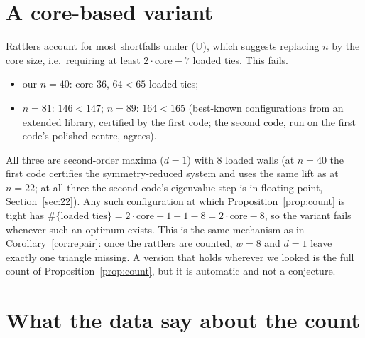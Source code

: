 \documentclass[11pt]{amsart}
\theoremstyle{definition}
\newcommand{\core}{\mathrm{core}}
\begin{document}
\section{A core-based variant}\label{sec:repair}

Rattlers account for most shortfalls under (U), which suggests replacing $n$ by the core size, i.e.\ requiring at least $2\cdot\core - 7$ loaded ties. This fails. %
\begin{itemize}
\item our $n = 40$: core $36$, $64 < 65$ loaded ties; %
\item $n = 81$: $146 < 147$; $n = 89$: $164 < 165$ (best-known configurations from an extended library, certified by the first code; the second code, run on the first code's polished centre, agrees). %
\end{itemize}
All three are second-order maxima ($d = 1$) with 8 loaded walls (at $n = 40$ the first code certifies the symmetry-reduced system and uses the same lift as at $n = 22$; at all three the second code's eigenvalue step is in floating point, Section~\ref{sec:22}). Any such configuration at which Proposition~\ref{prop:count} is tight has $\#\{\text{loaded ties}\} = 2\cdot\core + 1 - 1 - 8 = 2\cdot\core - 8$, so the variant fails whenever such an optimum exists. This is the same mechanism as in Corollary~\ref{cor:repair}: once the rattlers are counted, $w = 8$ and $d = 1$ leave exactly one triangle missing. A version that holds wherever we looked is the full count of Proposition~\ref{prop:count}, but it is automatic and not a conjecture.

\section{What the data say about the count}\label{sec:correct}
\end{document}
